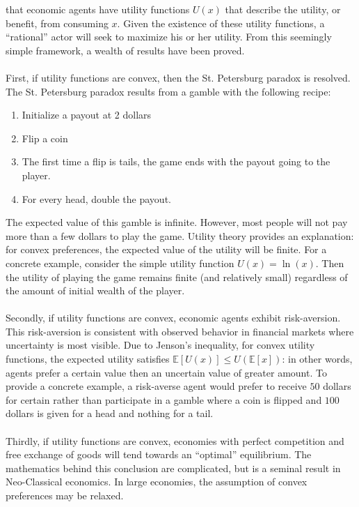 \documentclass{article}
\begin{document}
 that economic agents have utility functions \(U(x)\) that describe the utility, or benefit, from consuming \(x\).  Given the existence of these utility functions, a ``rational'' actor will seek to maximize his or her utility.  From this seemingly simple framework, a wealth of results have been proved.  
\\
\\
First, if utility functions are convex, then the St. Petersburg paradox is resolved.  The St. Petersburg paradox results from a gamble with the following recipe:
\begin{enumerate}
	\item Initialize a payout at 2 dollars
	\item Flip a coin
	\item The first time a flip is tails, the game ends with the payout going to the player.
	\item For every head, double the payout.
\end{enumerate}
The expected value of this gamble is infinite.  However, most people will not pay more than a few dollars to play the game.  Utility theory provides an explanation: for convex preferences, the expected value of the utility will be finite.  For a concrete example, consider the simple utility function \(U(x)=\ln(x)\).  Then the utility of playing the game remains finite (and relatively small) regardless of the amount of initial wealth of the player.  
\\
\\
Secondly, if utility functions are convex, economic agents exhibit risk-aversion.  This risk-aversion is consistent with observed behavior in financial markets where uncertainty is most visible.  Due to Jenson's inequality, for convex utility functions, the expected utility satisfies \(\mathbb{E}\left[U(x)\right] \leq U(\mathbb{E}[x])\): in other words, agents prefer a certain value then an uncertain value of greater amount.  To provide a concrete example, a risk-averse agent would prefer to receive \(50\) dollars for certain rather than participate in a gamble where a coin is flipped and \(100\) dollars is given for a head and nothing for a tail.  
\\
\\
Thirdly, if utility functions are convex, economies with perfect competition and free exchange of goods will tend towards an ``optimal'' equilibrium.  The mathematics behind this conclusion are complicated, but is a seminal result in Neo-Classical economics.  In large economies, the assumption of convex preferences may be relaxed.  
\end{document}
